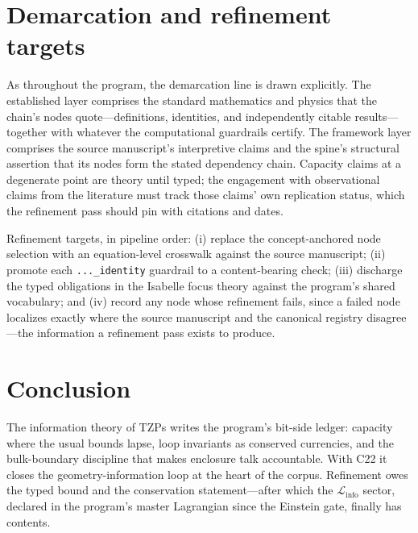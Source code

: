 \documentclass[11pt]{article}
\theoremstyle{remark}
\begin{document}
\section{Demarcation and refinement targets}
\label{sec:demarc}

As throughout the program, the demarcation line is drawn explicitly. The established layer comprises the standard mathematics and physics that the chain's nodes quote---definitions, identities, and independently citable results---together with whatever the computational guardrails certify. The framework layer comprises the source manuscript's interpretive claims and the spine's structural assertion that its nodes form the stated dependency chain. Capacity claims at a degenerate point are theory until typed; the engagement with observational claims from the literature must track those claims' own replication status, which the refinement pass should pin with citations and dates.

Refinement targets, in pipeline order: (i) replace the concept-anchored node selection with an equation-level crosswalk against the source manuscript; (ii) promote each \texttt{...\_identity} guardrail to a content-bearing check; (iii) discharge the typed obligations in the Isabelle focus theory against the program's shared vocabulary; and (iv) record any node whose refinement fails, since a failed node localizes exactly where the source manuscript and the canonical registry disagree---the information a refinement pass exists to produce.

\section{Conclusion}
\label{sec:conc}

The information theory of TZPs writes the program's bit-side ledger: capacity where the usual bounds lapse, loop invariants as conserved currencies, and the bulk-boundary discipline that makes enclosure talk accountable. With C22 it closes the geometry-information loop at the heart of the corpus. Refinement owes the typed bound and the conservation statement---after which the $\mathcal{L}_{\mathrm{info}}$ sector, declared in the program's master Lagrangian since the Einstein gate, finally has contents.
\end{document}
